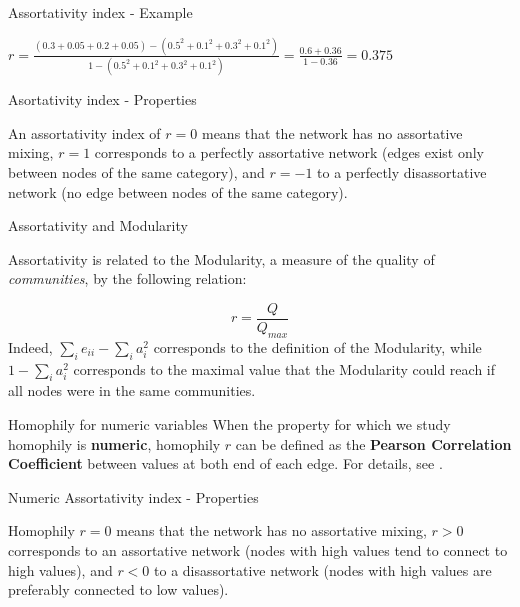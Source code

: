 \documentclass[a4paper,11pt]{book}
\begin{document}
\begin{textbox}{Assortativity index - Example}
\vspace{0.3cm}

$r=\frac{(0.3+0.05+0.2+0.05)-(0.5^2+0.1^2+0.3^2+0.1^2)}{1-(0.5^2+0.1^2+0.3^2+0.1^2)}=\frac{0.6+0.36}{1-0.36}=0.375$
\end{textbox}























\begin{textbox}{Asortativity index - Properties}

An assortativity index of $r=0$ means that the network has no assortative mixing, $r=1$ corresponds to a perfectly assortative network (edges exist only between nodes of the same category), and $r=-1$ to a perfectly disassortative network (no edge between nodes of the same category).
\end{textbox}




\begin{textbox}{Assortativity and Modularity}

Assortativity is related to the Modularity, a measure of the quality of \textit{communities}, by the following relation:

\[
r=\frac{Q}{Q_{max}}
\]
Indeed, $\sum_i e_{ii} - \sum_i a_i^2$ corresponds to the definition of the Modularity, while $1- \sum_i a_i^2$ corresponds to the maximal value that the Modularity could reach if all nodes were in the same communities.
\end{textbox}








\begin{textbox}{Homophily for numeric variables}
When the property for which we study homophily is \textbf{numeric}, homophily $r$ can be defined as the \textbf{Pearson Correlation Coefficient} between values at both end of each edge. For details, see \cite{newman2003mixing}.

\end{textbox}




\begin{textbox}{Numeric Assortativity index - Properties}

Homophily $r=0$ means that the network has no assortative mixing, $r>0$ corresponds to an assortative network (nodes with high values tend to connect to high values), and $r<0$ to a disassortative network (nodes with high values are preferably connected to low values).

\end{textbox}
\end{document}
